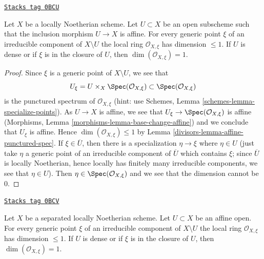 \begin{lemma}
\label{divisors-lemma-complement-affine-open-immersion}
\href{https://stacks.math.columbia.edu/tag/0BCU}{\texttt{Stacks tag 0BCU}}

\begin{reference}
\cite[EGA IV, Corollaire 21.12.7]{EGA4}
\end{reference}
Let $X$ be a locally Noetherian scheme. Let $U \subset X$ be an open subscheme
such that the inclusion morphism $U \to X$ is affine.
For every generic point $\xi$ of an irreducible component of
$X \setminus U$ the local ring $\mathcal{O}_{X, \xi}$
has dimension $\leq 1$. If $U$ is dense or if $\xi$ is in the closure
of $U$, then $\dim(\mathcal{O}_{X, \xi}) = 1$.
\end{lemma}

\begin{proof}

Since $\xi$ is a generic point of $X \setminus U$, we see that
$$
U_\xi = U \times_X \Spec(\mathcal{O}_{X, \xi}) \subset
\Spec(\mathcal{O}_{X, \xi})
$$
is the punctured spectrum of $\mathcal{O}_{X, \xi}$ (hint: use
Schemes, Lemma \ref{schemes-lemma-specialize-points}).
As $U \to X$ is affine, we see that $U_\xi \to \Spec(\mathcal{O}_{X, \xi})$
is affine (Morphisms, Lemma \ref{morphisms-lemma-base-change-affine})
and we conclude that $U_\xi$ is affine.
Hence $\dim(\mathcal{O}_{X, \xi}) \leq 1$ by
Lemma \ref{divisors-lemma-affine-punctured-spec}.
If $\xi \in \overline{U}$, then there is a specialization
$\eta \to \xi$ where $\eta \in U$ (just take $\eta$ a generic
point of an irreducible component of $\overline{U}$ which
contains $\xi$; since $\overline{U}$ is locally Noetherian,
hence locally has finitely many irreducible components, we see that
$\eta \in U$). Then $\eta \in \Spec(\mathcal{O}_{X, \xi})$ and
we see that the dimension cannot be $0$.
\end{proof}

\begin{lemma}
\label{divisors-lemma-complement-affine-open}
\href{https://stacks.math.columbia.edu/tag/0BCV}{\texttt{Stacks tag 0BCV}}

Let $X$ be a separated locally Noetherian scheme. Let $U \subset X$ be an
affine open. For every generic point $\xi$ of an irreducible component of
$X \setminus U$ the local ring $\mathcal{O}_{X, \xi}$
has dimension $\leq 1$. If $U$ is dense or if $\xi$ is in the closure
of $U$, then $\dim(\mathcal{O}_{X, \xi}) = 1$.
\end{lemma}

